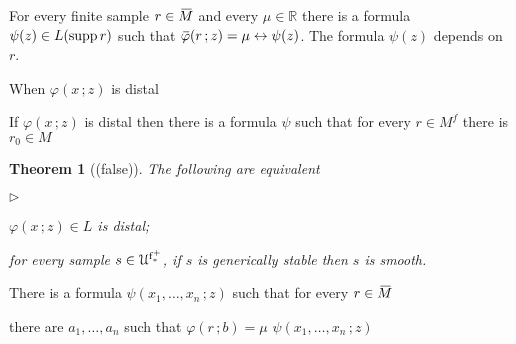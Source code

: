 \documentclass[10pt,openany]{article}
\newcommand{\mylabel}[1]{{\ssf{#1}}\hfill}
\renewenvironment{itemize}
  {\begin{list}{$\triangleright$}{%
   \setlength{\parskip}{0mm}
   \setlength{\topsep}{.4\baselineskip}
   \setlength{\rightmargin}{0mm}
   \setlength{\listparindent}{0mm}
   \setlength{\itemindent}{0mm}
   \setlength{\labelwidth}{3ex}
   \setlength{\itemsep}{.4\baselineskip}
   \setlength{\parsep}{0mm}
   \setlength{\partopsep}{0mm}
   \setlength{\labelsep}{1ex}
   \setlength{\leftmargin}{\labelwidth+\labelsep}
   \let\makelabel\mylabel}}{%
   \end{list}\vspace*{-\parskip}
  }
\def\RR{\mathds R}
\def\supp{\mathop{\rm supp}}
\newcommand{\sbar}[1]{\mkern 3mu\overline{\mkern-3mu#1\mkern-1mu}\mkern 1mu}
\newcommand{\barM}{\mkern 4mu\overline{\mkern-4mu M\mkern-2mu}\mkern 2mu}
\def\iff{\leftrightarrow}
\def\U{\EuScript U}
\def\phi{\varphi}
\def\ssf#1{\textsf{\small #1}}
\newcounter{thm}[section]
\theoremstyle{mio}
\newtheorem{theorem}[thm]{Theorem}
\theoremstyle{liscio}
\begin{document}
For every finite sample $r\in \barM$ and every $\mu\in\RR$ there is a formula $\psi(z)\in L(\supp r)$ such that $\sbar\phi(r\,;z)=\mu \iff \psi(z)$. The formula $\psi(z)$ depends on $r$.

When $\phi(x\,;z)$ is distal

If  $\phi(x\,;z)$ is distal then there is a formula $\psi$ such that  for every $r\in M^f$ there is $r_0\in M^{}$

\begin{theorem}[(false)]
  The following are equivalent
  \begin{itemize}
    \item[1.] $\phi(x\,;z)\in L$ is distal;
    \item[2.] for every sample $s\in\U^{\rm f^+_*}$, if $s$ is generically stable then $s$ is smooth.

  \end{itemize}
\end{theorem}

There is a formula $\psi(x_1,\dots,x_n\,;z)$ such that for every $r\in \barM$

there are $a_1,\dots,a_n$ such that $\phi(r\,;b)=\mu$ $\psi(x_1,\dots,x_n\,;z)$
\end{document}
